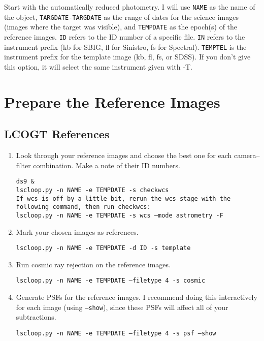 Start with the automatically reduced photometry. I will use {\tt NAME} as the name of the object, {\tt TARGDATE-TARGDATE} as the range of dates for the science images (images where the target was visible), and {\tt TEMPDATE} as the epoch(s) of the reference images. {\tt ID} refers to the ID number of a specific file. {\tt IN} refers to the instrument prefix (kb for SBIG, fl for Sinistro, fs for Spectral). {\tt TEMPTEL} is the instrument prefix for the template image (kb, fl, fs, or SDSS). If you don't give this option, it will select the same instrument given with -T.

\section{Prepare the Reference Images}
\subsection{LCOGT References}
\begin{enumerate}

\item Look through your reference images and choose the best one for each camera--filter combination. Make a note of their ID numbers.

{\tt ds9 \& } \\
{\tt lscloop.py -n NAME -e TEMPDATE -s checkwcs} \\
{\tt If wcs is off by a little bit, rerun the wcs stage with the following command, then run checkwcs:} \\
{\tt lscloop.py -n NAME -e TEMPDATE -s wcs --mode astrometry -F}

\item Mark your chosen images as references.

{\tt lscloop.py -n NAME -e TEMPDATE -d ID -s template}

\item Run cosmic ray rejection on the reference images.

{\tt lscloop.py -n NAME -e TEMPDATE --filetype 4 -s cosmic}

\item Generate PSFs for the reference images. I recommend doing this interactively for each image (using {\tt --show}), since these PSFs will affect all of your subtractions.

{\tt lscloop.py -n NAME -e TEMPDATE --filetype 4 -s psf --show}

\end{enumerate}

